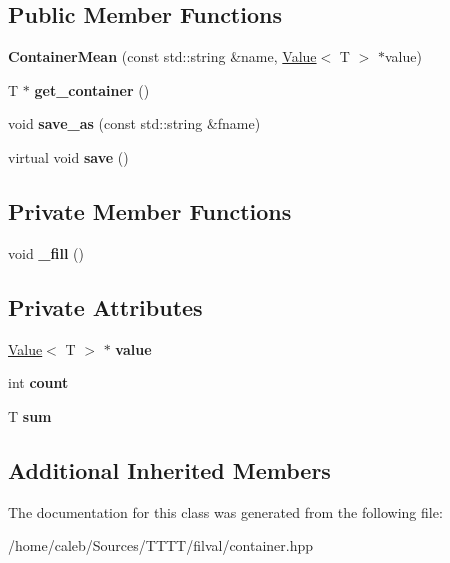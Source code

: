 \subsection*{Public Member Functions}
\begin{DoxyCompactItemize}
\item 
\hypertarget{classfv_1_1ContainerMean_a6a577d9ee5d9aeff0918d192974262e1}{}\label{classfv_1_1ContainerMean_a6a577d9ee5d9aeff0918d192974262e1} 
{\bfseries Container\+Mean} (const std\+::string \&name, \hyperlink{classfv_1_1Value}{Value}$<$ T $>$ $\ast$value)
\item 
\hypertarget{classfv_1_1ContainerMean_ad02d976b076e3fb6ad3bb15eb35406d4}{}\label{classfv_1_1ContainerMean_ad02d976b076e3fb6ad3bb15eb35406d4} 
T $\ast$ {\bfseries get\+\_\+container} ()
\item 
\hypertarget{classfv_1_1ContainerMean_a9fa3d582ae665ea4f5ee1c7215fe0ff0}{}\label{classfv_1_1ContainerMean_a9fa3d582ae665ea4f5ee1c7215fe0ff0} 
void {\bfseries save\+\_\+as} (const std\+::string \&fname)
\item 
\hypertarget{classfv_1_1ContainerMean_ab917d198ce468125b06c71dbe77e5c59}{}\label{classfv_1_1ContainerMean_ab917d198ce468125b06c71dbe77e5c59} 
virtual void {\bfseries save} ()
\end{DoxyCompactItemize}
\subsection*{Private Member Functions}
\begin{DoxyCompactItemize}
\item 
\hypertarget{classfv_1_1ContainerMean_a5f6d834f6490729852fb807feb775a75}{}\label{classfv_1_1ContainerMean_a5f6d834f6490729852fb807feb775a75} 
void {\bfseries \+\_\+fill} ()
\end{DoxyCompactItemize}
\subsection*{Private Attributes}
\begin{DoxyCompactItemize}
\item 
\hypertarget{classfv_1_1ContainerMean_aa772cde78fd0971d1ebba909aff491c1}{}\label{classfv_1_1ContainerMean_aa772cde78fd0971d1ebba909aff491c1} 
\hyperlink{classfv_1_1Value}{Value}$<$ T $>$ $\ast$ {\bfseries value}
\item 
\hypertarget{classfv_1_1ContainerMean_a39cdef23a358ab46173eaa588e59ce49}{}\label{classfv_1_1ContainerMean_a39cdef23a358ab46173eaa588e59ce49} 
int {\bfseries count}
\item 
\hypertarget{classfv_1_1ContainerMean_ac85f2f56241ebf5099784250288c585b}{}\label{classfv_1_1ContainerMean_ac85f2f56241ebf5099784250288c585b} 
T {\bfseries sum}
\end{DoxyCompactItemize}
\subsection*{Additional Inherited Members}


The documentation for this class was generated from the following file\+:\begin{DoxyCompactItemize}
\item 
/home/caleb/\+Sources/\+T\+T\+T\+T/filval/container.\+hpp\end{DoxyCompactItemize}
